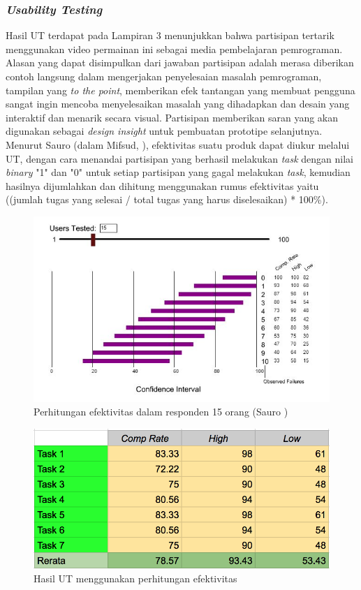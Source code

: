 	\subsubsection{\textit{Usability Testing}}
	Hasil UT terdapat pada Lampiran 3 menunjukkan bahwa partisipan tertarik menggunakan video permainan ini sebagai media pembelajaran pemrograman. Alasan yang dapat disimpulkan dari jawaban partisipan adalah merasa diberikan contoh langsung dalam mengerjakan penyelesaian masalah pemrograman, tampilan yang \textit{to the point}, memberikan efek tantangan yang membuat pengguna sangat ingin mencoba menyelesaikan masalah yang dihadapkan dan desain yang interaktif dan menarik secara visual. Partisipan memberikan saran yang akan digunakan sebagai \textit{design insight} untuk pembuatan prototipe selanjutnya.
	\linebreak\linebreak
	Menurut Sauro (dalam Mifsud, \citeyear{article.sauroMifsud}), efektivitas suatu produk dapat diukur melalui UT, dengan cara menandai partisipan yang berhasil melakukan \textit{task} dengan nilai \textit{binary} "1" dan "0" untuk setiap partisipan yang gagal melakukan \textit{task}, kemudian hasilnya dijumlahkan dan dihitung menggunakan rumus efektivitas yaitu ((jumlah tugas yang selesai / total tugas yang harus diselesaikan) * 100\%).
	\begin{figure}
		\centering
		\includegraphics[width=\linewidth]{pics/perhitungan-sauro}
		\caption{Perhitungan efektivitas dalam responden 15 orang (Sauro \citeyear{article.sauroWhat})}
	\end{figure}
	\begin{figure}
		\centering
		\includegraphics[width=\linewidth]{pics/hasil_sauro}
		\caption{Hasil UT menggunakan perhitungan efektivitas}
	\end{figure}
